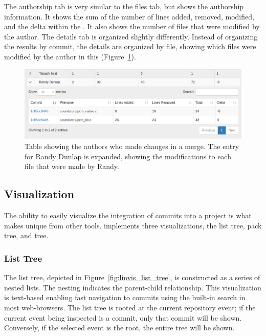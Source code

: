 The authorship tab is very similar to the files tab, but shows the
authorship information. It shows the sum of the number of lines added,
removed, modified, and the delta within the \mt. It also shows the
number of files that were modified by the author. The details tab is
organized slightly differently. Instead of organizing the results by
commit, the details are organized by file, showing which files were
modified by the author in this \mt (Figure~\ref{fig:linvis_authors}).

\begin{figure}[htpb]
  \centering
  \includegraphics[width=\linewidth]{figures/linvis/linvis_authors.png}
  \caption{Table showing the authors who made changes in a merge. The
    entry for Randy Dunlap is expanded, showing the modifications to
    each file that were made by Randy.}
  \label{fig:linvis_authors}
\end{figure}


\subsection{Visualization}
\label{sub:visualization}

The ability to easily visualize the integration of commits into a
project is what makes \tool unique from other tools. \tool implements
three visualizations, the list tree, pack tree, and \rt tree.

\subsubsection{List Tree}

The list tree, depicted in Figure~\ref{fig:linvis_list_tree}, is
constructed as a series of nested lists. The nesting indicates the
parent-child relationship. This visualization is text-based enabling
fast navigation to commits using the built-in search in most
web-browsers. The list tree is rooted at the current repository event;
if the current event being inspected is a commit, only that commit will
be shown. Conversely, if the selected event is the root, the entire
\mt tree will be shown.

